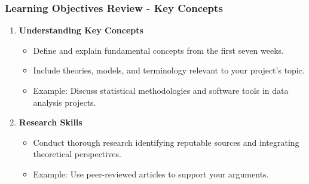 \documentclass[aspectratio=169]{beamer}
\begin{document}
\begin{frame}[fragile]
    \frametitle{Learning Objectives Review - Key Concepts}
    \begin{enumerate}
        \item \textbf{Understanding Key Concepts}
            \begin{itemize}
                \item Define and explain fundamental concepts from the first seven weeks.
                \item Include theories, models, and terminology relevant to your project’s topic.
                \item Example: Discuss statistical methodologies and software tools in data analysis projects.
            \end{itemize}

        \item \textbf{Research Skills}
            \begin{itemize}
                \item Conduct thorough research identifying reputable sources and integrating theoretical perspectives.
                \item Example: Use peer-reviewed articles to support your arguments.
            \end{itemize}
    \end{enumerate}
\end{frame}
\end{document}

